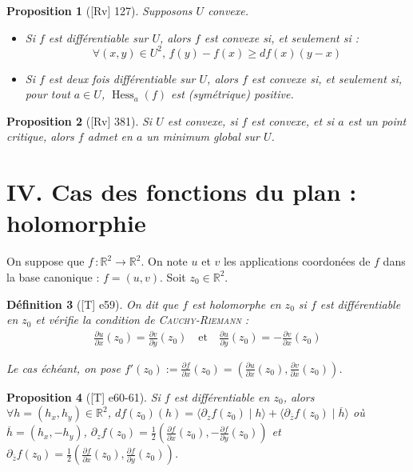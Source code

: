 \documentclass[10pt, a4paper, parskip=full, twoside, twocolumn]{report}
\newtheorem{definition}{Définition}
\newtheorem{proposition}[definition]{Proposition}
\newcommand{\IR}{\mathbb{R}}
\newcommand{\ps}[2]{\langle #1\mid #2\rangle}
\DeclareMathOperator{\Hess}{Hess}
\begin{document}
\begin{proposition}[\textnormal{[Rv] 127}]
	Supposons $U$ convexe. 
	\begin{itemize}
		\item Si $f$ est différentiable sur $U$, alors $f$ est convexe si, et seulement si : $$\forall(x,y)\in U^2,\, f(y)-f(x)\geq df(x)(y-x)$$
		\item Si $f$ est deux fois différentiable sur $U$, alors $f$ est convexe si, et seulement si, pour tout $a\in U$, $\Hess_a(f)$ est (symétrique) positive.
	\end{itemize}
\end{proposition}

\begin{proposition}[\textnormal{[Rv] 381}]
	Si $U$ est convexe, si $f$ est convexe, et si $a$ est un point critique, alors $f$ admet en $a$ un minimum global sur $U$.
\end{proposition}

\section*{IV. Cas des fonctions du plan : holomorphie}
\textcolor{paragraphtext}{On suppose que $f\,\colon \IR^2\to \IR^2$. On note $u$ et $v$ les applications coordonées de $f$ dans la base canonique : $f=(u,v)$. Soit $z_0\in\IR^2$.}

\begin{definition}[\textnormal{[T] e59}]
	On dit que $f$ est \emph{holomorphe en $z_0$} si $f$ est différentiable en $z_0$ et vérifie la condition de \textsc{Cauchy-Riemann} :
	\begin{align*}
		\frac{\partial u}{\partial x}(z_0) = \frac{\partial v}{\partial y}(z_0)\quad\text{et}\quad \frac{\partial u}{\partial y}(z_0) = -\frac{\partial v}{\partial x}(z_0)
	\end{align*}

	Le cas échéant, on pose $f'(z_0) := \frac{\partial f}{\partial x}(z_0) = \left(\frac{\partial u}{\partial x}(z_0), \frac{\partial v}{\partial x}(z_0)\right)$.
\end{definition}

\begin{proposition}[\textnormal{[T] e60-61}]
	Si $f$ est différentiable en $z_0$, alors $\forall h=(h_x,h_y)\in\IR^2$, $df(z_0)(h) = \ps{\partial_z f(z_0)}{h} + \ps{\partial_{\overline{z}} f(z_0)}{\overline{h}}$
	où $\overline{h} = (h_x, -h_y)$, $\partial_z f(z_0) = \frac{1}{2}\left(\frac{\partial f}{\partial x}(z_0), -\frac{\partial f}{\partial y}(z_0)\right)$ et $\partial_{\overline{z}} f(z_0) = \frac{1}{2}\left(\frac{\partial f}{\partial x}(z_0), \frac{\partial f}{\partial y}(z_0)\right)$.
\end{proposition}
\end{document}
